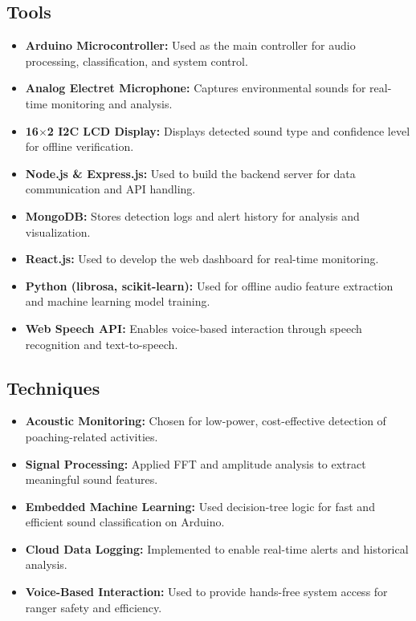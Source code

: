 \documentclass[11pt,a4paper,oneside]{report}
\begin{document}
\subsection{Tools}
\begin{itemize}
    \item \textbf{Arduino Microcontroller:} Used as the main controller for audio processing, classification, and system control.
    \item \textbf{Analog Electret Microphone:} Captures environmental sounds for real-time monitoring and analysis.
    \item \textbf{16$\times$2 I2C LCD Display:} Displays detected sound type and confidence level for offline verification.
    \item \textbf{Node.js \& Express.js:} Used to build the backend server for data communication and API handling.
    \item \textbf{MongoDB:} Stores detection logs and alert history for analysis and visualization.
    \item \textbf{React.js:} Used to develop the web dashboard for real-time monitoring.
    \item \textbf{Python (librosa, scikit-learn):} Used for offline audio feature extraction and machine learning model training.
    \item \textbf{Web Speech API:} Enables voice-based interaction through speech recognition and text-to-speech.
\end{itemize}

\subsection{Techniques}
\begin{itemize}
    \item \textbf{Acoustic Monitoring:} Chosen for low-power, cost-effective detection of poaching-related activities.
    \item \textbf{Signal Processing:} Applied FFT and amplitude analysis to extract meaningful sound features.
    \item \textbf{Embedded Machine Learning:} Used decision-tree logic for fast and efficient sound classification on Arduino.
    \item \textbf{Cloud Data Logging:} Implemented to enable real-time alerts and historical analysis.
    \item \textbf{Voice-Based Interaction:} Used to provide hands-free system access for ranger safety and efficiency.
\end{itemize}
\end{document}
